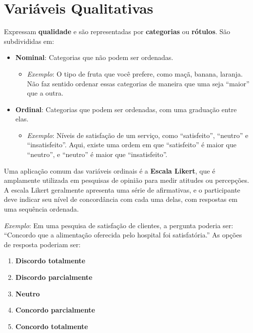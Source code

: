\documentclass[
]{book}
\providecommand{\tightlist}{%
  \setlength{\itemsep}{0pt}\setlength{\parskip}{0pt}}
\begin{document}
\section{Variáveis Qualitativas}\label{variuxe1veis-qualitativas}

Expressam \textbf{qualidade} e são representadas por \textbf{categorias} ou \textbf{rótulos}. São subdivididas em:

\begin{itemize}
\tightlist
\item
  \textbf{Nominal}: Categorias que não podem ser ordenadas.

  \begin{itemize}
  \tightlist
  \item
    \emph{Exemplo}: O tipo de fruta que você prefere, como maçã, banana, laranja. Não faz sentido ordenar essas categorias de maneira que uma seja ``maior'' que a outra.
  \end{itemize}
\item
  \textbf{Ordinal}: Categorias que podem ser ordenadas, com uma graduação entre elas.

  \begin{itemize}
  \tightlist
  \item
    \emph{Exemplo}: Níveis de satisfação de um serviço, como ``satisfeito'', ``neutro'' e ``insatisfeito''. Aqui, existe uma ordem em que ``satisfeito'' é maior que ``neutro'', e ``neutro'' é maior que ``insatisfeito''.
  \end{itemize}
\end{itemize}

Uma aplicação comum das variáveis ordinais é a \textbf{Escala Likert}, que é amplamente utilizada em pesquisas de opinião para medir atitudes ou percepções. A escala Likert geralmente apresenta uma série de afirmativas, e o participante deve indicar seu nível de concordância com cada uma delas, com respostas em uma sequência ordenada.

\emph{Exemplo}: Em uma pesquisa de satisfação de clientes, a pergunta poderia ser: ``Concordo que a alimentação oferecida pelo hospital foi satisfatória.'' As opções de resposta poderiam ser:

\begin{enumerate}
\def\labelenumi{\arabic{enumi}.}
\tightlist
\item
  \textbf{Discordo totalmente}
\item
  \textbf{Discordo parcialmente}
\item
  \textbf{Neutro}
\item
  \textbf{Concordo parcialmente}
\item
  \textbf{Concordo totalmente}
\end{enumerate}
\end{document}
